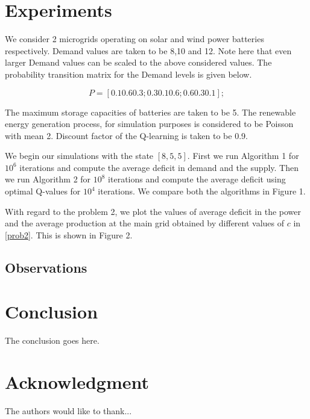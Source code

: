 \documentclass[conference]{IEEEtran}
\begin{document}
\section{Experiments}
We consider 2 microgrids operating on solar and wind power batteries respectively. Demand values are taken to be 8,10 and 12. Note here that even larger Demand values can be scaled to the above considered values. The probability transition matrix for the Demand levels is given below. 

$$ P = [0.1 0.6 0.3; 0.3 0.1 0.6; 0.6 0.3 0.1];$$

The maximum storage capacities of batteries are taken to be 5. The renewable energy generation process, for simulation purposes is considered to be Poisson with mean 2. Discount factor of the Q-learning is taken to be 0.9.

We begin our simulations with the state $[8,5,5]$. First we run Algorithm 1 for $10^6$ iterations and compute the average deficit in demand and the supply. Then we run Algorithm 2 for $10^8$ iterations and compute the average deficit using optimal Q-values for $10^4$ iterations. We compare both the algorithms in Figure 1.

With regard to the problem 2, we plot the values of average deficit in the power and the average production at the main grid obtained by different values of $c$ in \eqref{prob2}. This is shown in Figure 2. 

\subsection{Observations}


\section{Conclusion}
The conclusion goes here.






\section*{Acknowledgment}


The authors would like to thank...


 
 




\end{document}
